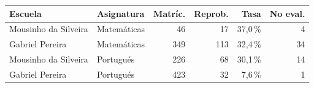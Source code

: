 \begin{tabular}{llrrrr}
\toprule
Escuela & Asignatura & Matríc. & Reprob. & Tasa & No eval. \\
\midrule
Mousinho da Silveira & Matemáticas & 46 & 17 & 37,0\,\% & 4 \\
Gabriel Pereira & Matemáticas & 349 & 113 & 32,4\,\% & 34 \\
Mousinho da Silveira & Portugués & 226 & 68 & 30,1\,\% & 14 \\
Gabriel Pereira & Portugués & 423 & 32 & 7,6\,\% & 1 \\
\bottomrule
\end{tabular}

